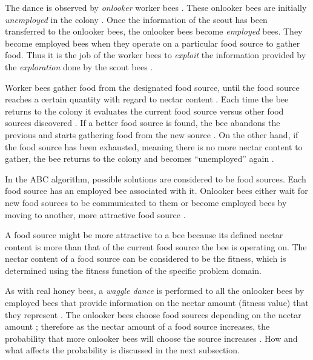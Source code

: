 The dance is observed by \emph{onlooker} worker bees \cite{ABCCompareStudy,ABCImageEnhancement}. These onlooker bees are initially \emph{unemployed} in the colony \cite{ABCCompareStudy,ABCImageEnhancement}. Once the information of the scout has been transferred to the onlooker bees, the onlooker bees become \emph{employed} bees\cite{ABCCompareStudy,ABCImageEnhancement}. They become employed bees when they operate on a particular food source to gather food\cite{ABCCompareStudy,ABCImageEnhancement}. Thus it is the job of the worker bees to \emph{exploit} the information provided by the \emph{exploration} done by the scout bees \cite{ABCCompareStudy,ABCNumericalOptimization}. 

Worker bees gather food from the designated food source, until the food source reaches a certain quantity with regard to nectar content \cite{ABCCompareStudy,ABCNumericalOptimization}. Each time the bee returns to the colony it evaluates the current food source versus other food sources discovered \cite{ABCCompareStudy,ABCNumericalOptimization}. If a better food source is found, the bee abandons the previous and starts gathering food from the new source \cite{ABCCompareStudy,ABCNumericalOptimization}. On the other hand, if the food source has been exhausted, meaning there is no more nectar content to gather, the bee returns to the colony and becomes ``unemployed'' again \cite{ABCCompareStudy,ABCNumericalOptimization}.

In the \gls{ABC} algorithm, possible solutions are considered to be food sources\cite{ABCCompareStudy,ABCNumericalOptimization}. Each food source has an employed bee associated with it. Onlooker bees either wait for new food sources to be communicated to them or become employed bees by moving to another, more attractive food source \cite{ABCCompareStudy,ABCNumericalOptimization}. 

A food source might be more attractive to a bee because its defined nectar content is more than that of the current food source the bee is operating on\cite{ABCCompareStudy,ABCNumericalOptimization}. The nectar content of a food source can be considered to be the fitness, which is determined using the fitness function of the specific problem domain\cite{ABCCompareStudy,ABCNumericalOptimization}.

As with real honey bees, a \emph{waggle dance} is performed to all the onlooker bees by employed bees that provide information on the nectar amount (fitness value) that they represent \cite{ABCReconfigDistro,ABCCompareStudy,ABCImageEnhancement}. The onlooker bees choose food sources depending on the nectar amount \cite{ABCReconfigDistro,ABCCompareStudy,ABCImageEnhancement}; therefore as the nectar amount of a food source increases, the probability that more onlooker bees will choose the source increases \cite{ABCReconfigDistro,ABCCompareStudy,ABCImageEnhancement}. How and what affects the probability is discussed in the next subsection.


